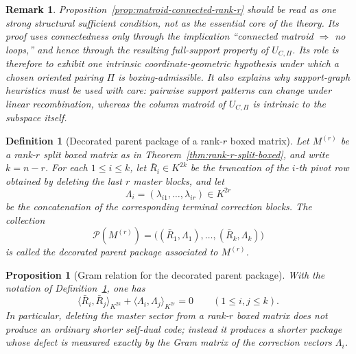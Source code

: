 \documentclass[12pt]{article}
\newtheorem{defn}{Definition}[section]
\newtheorem{prop}[theorem]{Proposition}
\newtheorem{remark}[theorem]{Remark}
\begin{document}
\begin{remark}
\rm
Proposition~\ref{prop:matroid-connected-rank-r} should be read as one strong structural sufficient condition, not as the essential core of the theory. Its proof uses connectedness only through the implication ``connected matroid \(\Rightarrow\) no loops,'' and hence through the resulting full-support property of \(U_{C,\Pi}\). Its role is therefore to exhibit one intrinsic coordinate-geometric hypothesis under which a chosen oriented pairing \(\Pi\) is boxing-admissible. It also explains why support-graph heuristics must be used with care: pairwise support patterns can change under linear recombination, whereas the column matroid of \(U_{C,\Pi}\) is intrinsic to the subspace itself.
\end{remark}

\begin{defn}[Decorated parent package of a rank-\texorpdfstring{$r$}{r} boxed matrix]
\label{def:decorated-parent-package}
Let \(M^{(r)}\) be a rank-\(r\) split boxed matrix as in Theorem~\ref{thm:rank-r-split-boxed}, and write \(k=n-r\). For each \(1\le i\le k\), let \(\bar R_i\in K^{2k}\) be the truncation of the \(i\)-th pivot row obtained by deleting the last \(r\) master blocks, and let
\[
\Lambda_i=(\lambda_{i1},\dots,\lambda_{ir})\in K^{2r}
\]
be the concatenation of the corresponding terminal correction blocks. The collection
\[
\mathcal P(M^{(r)})=\bigl((\bar R_1,\Lambda_1),\dots,(\bar R_k,\Lambda_k)\bigr)
\]
is called the \emph{decorated parent package} associated to \(M^{(r)}\).
\end{defn}

\begin{prop}[Gram relation for the decorated parent package]
\label{prop:decorated-parent-gram}
With the notation of Definition~\ref{def:decorated-parent-package}, one has
\[
\langle \bar R_i,\bar R_j\rangle_{K^{2k}}+
\langle \Lambda_i,\Lambda_j\rangle_{K^{2r}}=0
\qquad (1\le i,j\le k).
\]
In particular, deleting the master sector from a rank-\(r\) boxed matrix does not produce an ordinary shorter self-dual code; instead it produces a shorter package whose defect is measured exactly by the Gram matrix of the correction vectors \(\Lambda_i\).
\end{prop}
\end{document}
